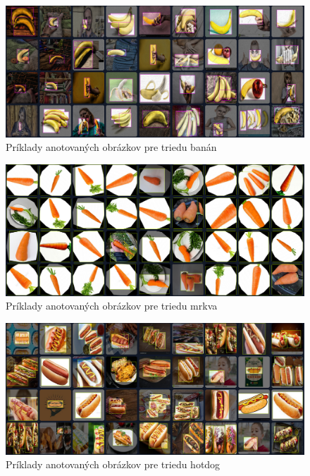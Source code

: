 \begin{figure}[H]
\centering
\includegraphics[width=\textwidth]{images/banana_example_annotations.png}
\caption{Príklady anotovaných obrázkov pre triedu banán}
\label{fig:image6011}
\end{figure}

\begin{figure}[H]
\centering
\includegraphics[width=\textwidth]{images/carrot_example_annotations.png}
\caption{Príklady anotovaných obrázkov pre triedu mrkva}
\label{fig:image6012}
\end{figure}

\begin{figure}[H]
\centering
\includegraphics[width=\textwidth]{images/hotdog_example_annotations.png}
\caption{Príklady anotovaných obrázkov pre triedu hotdog}
\label{fig:image6013}
\end{figure}

